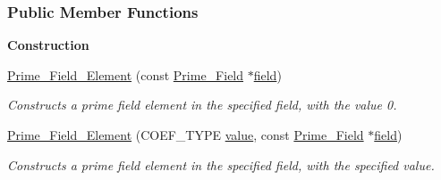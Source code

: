 \subsubsection*{Public Member Functions}
\begin{Indent}\textbf{ Construction}\par
\begin{DoxyCompactItemize}
\item 
\hyperlink{group___fields_group_ac4a46053696a327bc62038e1cf92c20a}{Prime\+\_\+\+Field\+\_\+\+Element} (const \hyperlink{group___fields_group_class_prime___field}{Prime\+\_\+\+Field} $\ast$\hyperlink{group___fields_group_a30f455dd34d4e795c63791cdc7ea1f46}{field})
\begin{DoxyCompactList}\small\item\em Constructs a prime field element in the specified field, with the value 0. \end{DoxyCompactList}\item 
\hyperlink{group___fields_group_a0bad5ba05aadbaf14876b2590e300861}{Prime\+\_\+\+Field\+\_\+\+Element} (C\+O\+E\+F\+\_\+\+T\+Y\+PE \hyperlink{group___fields_group_aa9c68761643afa0b22863904bdfe7e83}{value}, const \hyperlink{group___fields_group_class_prime___field}{Prime\+\_\+\+Field} $\ast$\hyperlink{group___fields_group_a30f455dd34d4e795c63791cdc7ea1f46}{field})
\begin{DoxyCompactList}\small\item\em Constructs a prime field element in the specified field, with the specified value. \end{DoxyCompactList}\end{DoxyCompactItemize}
\end{Indent}
